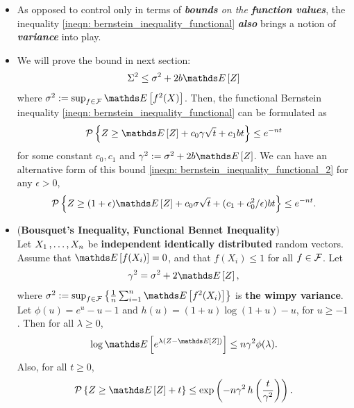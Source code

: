 \documentclass[11pt]{article}
\begin{document}
\begin{itemize}
\item \begin{remark}
As opposed to control only in terms of \emph{\textbf{bounds} on the \textbf{function values}}, the inequality \eqref{ineqn: bernstein_inequality_functional} \textbf{\emph{also}} brings a notion of \emph{\textbf{variance}} into play. 
\end{remark}

\item \begin{remark}
We will prove the bound in next section:
\begin{align*}
\Sigma^2 \le \sigma^2 + 2b\E{}{Z}
\end{align*} where $\sigma^2 := \sup_{f\in \cF}\E{}{f^2(X)}$. Then, the functional Bernstein inequality \eqref{ineqn: bernstein_inequality_functional} can be formulated as
\begin{align}
\cP\set{Z \ge \E{}{Z} +c_0 \gamma \sqrt{t} + c_1 bt} \le  e^{- n t}  \label{ineqn: bernstein_inequality_functional_2}
\end{align} for some constant $c_0, c_1$ and $\gamma^2 := \sigma^2 + 2b\E{}{Z}$. We can have an alternative form of this bound \eqref{ineqn: bernstein_inequality_functional_2} for any $\epsilon > 0$, 
\begin{align}
\cP\set{Z \ge (1+\epsilon)\E{}{Z} +c_0 \sigma \sqrt{t} + (c_1 + c_0^2/\epsilon)bt} \le  e^{- n t}.  \label{ineqn: bernstein_inequality_functional_3}
\end{align}
\end{remark}

\item \begin{theorem} (\textbf{Bousquet's Inequality, Functional Bennet Inequality})  \citep{boucheron2013concentration}\\
Let $X_1 \,{,}\ldots{,}\, X_n$ be \textbf{independent} \textbf{identically distributed} random vectors. Assume that $\E{}{f(X_i)} = 0$, and that $f(X_i) \le 1$ for all $f \in {\mathcal F}$.
Let
\begin{align*}
\gamma^2= \sigma^2 + 2\E{}{Z},
\end{align*} where $\sigma^2 := \sup_{f\in \cF}\set{\frac{1}{n}\sum_{i=1}^n\E{}{f^2(X_i)}}$ is \textbf{the wimpy variance}. Let $\phi(u) = e^u - u - 1$ and $h(u) = (1 + u) \log(1 + u) - u$, for $u \ge -1$. Then for all $\lambda \ge 0$,
\begin{align*}
\log \E{}{e^{\lambda\paren{Z - \E{}{Z}}}} \le n\gamma^2 \phi(\lambda).
\end{align*}
Also, for all $t \ge 0$,
\begin{align}
\cP\set{Z \ge \E{}{Z} + t} \le \exp\paren{- n\gamma^2 \, h\paren{\frac{t}{\gamma^2}}}. \label{ineqn: bousquet_inequality_bennet_functional}
\end{align}
\end{theorem}
\end{itemize}
\end{document}

